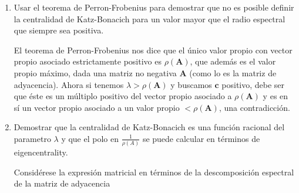 \documentclass[answers]{exam}
\begin{document}
\begin{questions}
\begin{enumerate}
\begin{enumerate}
\item Usar el teorema de Perron-Frobenius para demostrar que no es posible definir la centralidad de Katz-Bonacich para un valor mayor que el radio espectral que siempre sea positiva.

\begin{solution}




El teorema de Perron-Frobenius nos dice que el único valor propio con vector propio asociado estrictamente positivo es $\rho(\mathbf{A})$, que además es el valor propio máximo, dada una matriz no negativa $\mathbf{A}$ (como lo es la matriz de adyacencia). Ahora si tenemos $\lambda > \rho(\mathbf{A})$ y buscamos $\mathbf{c}$ positivo, debe ser que éste es un múltiplo positivo del vector propio asociado a $\rho(\mathbf{A})$ y es en sí un vector propio asociado a un valor propio $< \rho(\mathbf{A})$, una contradicción.
\end{solution}

\item Demostrar que la centralidad de Katz-Bonacich es una función racional del parametro $\lambda$ y que el polo en $\frac{1}{\rho(A)}$ se puede calcular en términos de eigencentrality.

\begin{solution}
Considérese la expresión matricial en términos de la descomposición espectral de la matriz de adyacencia


\end{solution}
\end{enumerate}
\end{enumerate}
\end{questions}
\end{document}
